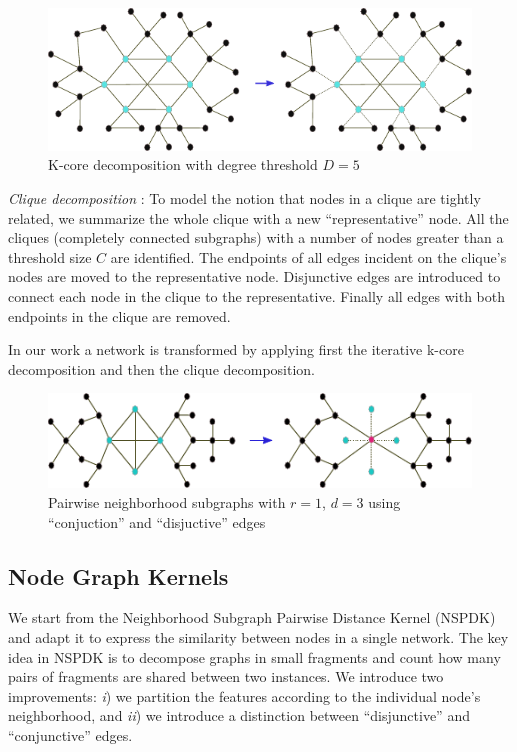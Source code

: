 \documentclass[review]{elsarticle}
\begin{document}
\begin{figure}
\centering
\includegraphics[width=.9\textwidth]{k_core}
\caption{K-core decomposition with degree threshold $D = 5$}
\label{fig:example}
\end{figure}

\textit{Clique decomposition} \cite{tarjan1985decomposition}: To model the notion that nodes in a clique are tightly related, we summarize the whole clique with a new ``representative'' node. All the cliques (completely connected subgraphs) with a number of nodes greater than a threshold size $C$ are identified. The endpoints of all edges incident on the clique's nodes are moved to the representative node. Disjunctive edges are introduced to connect each node in the clique to the representative. Finally all edges with both endpoints in the clique are removed.

In our work a network is transformed by applying first the iterative k-core decomposition and then the clique decomposition.

\begin{figure}
\centering
\includegraphics[width=.9\textwidth]{clique}
\caption{Pairwise neighborhood subgraphs with $r=1$, $d=3$ using ``conjuction'' and ``disjuctive'' edges}
\label{fig:example}
\end{figure}

\subsection{Node Graph Kernels} 
We start from the Neighborhood Subgraph Pairwise Distance Kernel (NSPDK) \cite{costa2010fast} and adapt it to express the similarity between nodes in a single network. The key idea in NSPDK is to decompose graphs in small fragments and count how many pairs of fragments are shared between two instances. We introduce two improvements: \textit{i}) we partition the features according to the individual node's neighborhood, and \textit{ii}) we introduce a  distinction between ``disjunctive'' and ``conjunctive'' edges.
\end{document}
